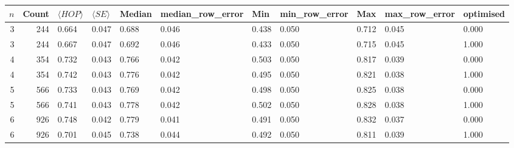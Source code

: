 \begin{tabular}{rrlllllllll}
\toprule
$n$ & Count & $\langle HOP \rangle$ & $\langle SE \rangle$ & Median & median_row_error & Min & min_row_error & Max & max_row_error & optimised \\
\midrule
3 & 244 & 0.664 & 0.047 & 0.688 & 0.046 & 0.438 & 0.050 & 0.712 & 0.045 & 0.000 \\
3 & 244 & 0.667 & 0.047 & 0.692 & 0.046 & 0.433 & 0.050 & 0.715 & 0.045 & 1.000 \\
4 & 354 & 0.732 & 0.043 & 0.766 & 0.042 & 0.503 & 0.050 & 0.817 & 0.039 & 0.000 \\
4 & 354 & 0.742 & 0.043 & 0.776 & 0.042 & 0.495 & 0.050 & 0.821 & 0.038 & 1.000 \\
5 & 566 & 0.733 & 0.043 & 0.769 & 0.042 & 0.498 & 0.050 & 0.825 & 0.038 & 0.000 \\
5 & 566 & 0.741 & 0.043 & 0.778 & 0.042 & 0.502 & 0.050 & 0.828 & 0.038 & 1.000 \\
6 & 926 & 0.748 & 0.042 & 0.779 & 0.041 & 0.491 & 0.050 & 0.832 & 0.037 & 0.000 \\
6 & 926 & 0.701 & 0.045 & 0.738 & 0.044 & 0.492 & 0.050 & 0.811 & 0.039 & 1.000 \\
\bottomrule
\end{tabular}
